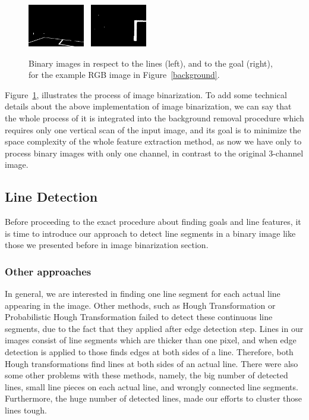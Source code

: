 \documentclass[	DIV=calc,%
							paper=a4,%
							fontsize=9pt,%
							twocolumn]{scrartcl}	 					%
\begin{document}
\begin{figure}[h!]
\caption{Binary images in respect to the lines (left),  and to the goal (right), for the example RGB image in Figure~\ref{background}.}
\label{binary}
\centering    
\includegraphics[width=0.22\textwidth]{figures/bin_lines.png} \	
\includegraphics[width=0.22\textwidth]{figures/bin_posts.png} \	
\end{figure}

Figure~\ref{binary}, illustrates the process of image binarization. To add some technical details about the above implementation of image binarization, we can say that the whole process of it is integrated into the background removal procedure which requires only one vertical scan of the input image, and its goal is to minimize the space complexity of the whole feature extraction method, as now we have only to process binary images with only one channel, in contrast to the original 3-channel image.

\subsection{Line Detection}
Before proceeding to the exact procedure about finding goals and line features, it is time to introduce our approach to detect line segments in a binary image like those we presented before in image binarization section.

\subsubsection{Other approaches}
In general, we are interested in finding one line segment for each actual line appearing in the image. Other methods, such as Hough Transformation or Probabilistic Hough Transformation failed to detect these continuous line segments, due to the fact that they applied after edge detection step. Lines in our images consist of line segments which are thicker than one pixel, and when edge detection is applied to those finds edges at both sides of a line. Therefore, both Hough transformations find lines at both sides of an actual line. There were also some other problems with these methods, namely, the big number of detected lines, small line pieces on each actual line, and wrongly connected line segments. Furthermore, the huge number of detected lines, made our efforts to cluster those lines tough.
\end{document}
